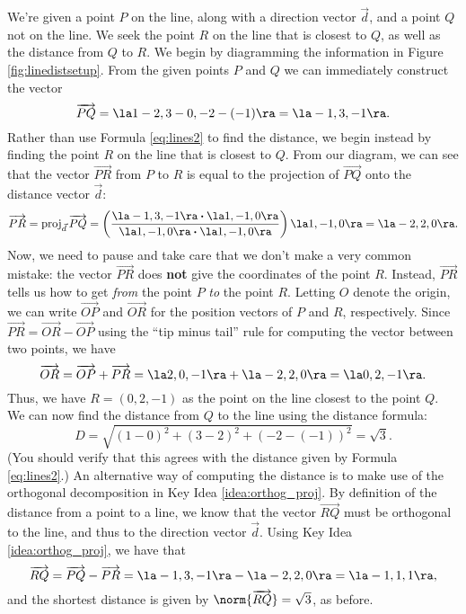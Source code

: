 {We're given a point $P$ on the line, along with a direction vector $\vec d$, and a point $Q$ not on the line. We seek the point $R$ on the line that is closest to $Q$, as well as the distance from $Q$ to $R$. We begin by diagramming the information in Figure \ref{fig:linedistsetup}. From the given points $P$ and $Q$ we can immediately construct the vector
\[
\overrightarrow{PQ}=\la 1-2, 3-0, -2-(-1)\ra = \la -1, 3, -1\ra.
\]
Rather than use Formula \eqref{eq:lines2} to find the distance, we begin instead by finding the point $R$ on the line that is closest to $Q$. From our diagram, we can see that the vector $\overrightarrow{PR}$ from $P$ to $R$ is equal to the projection of $\overrightarrow{PQ}$ onto the distance vector $\vec{d}$:
\[
\overrightarrow{PR}=\operatorname{proj}_{\vec{d}}\overrightarrow{PQ}= \left(\frac{\la -1,3,-1\ra\boldsymbol{\cdot}\la 1,-1,0\ra}{\la 1,-1,0\ra\boldsymbol{\cdot}\la 1,-1,0\ra}\right)\la 1,-1,0\ra = \la -2,2,0\ra.
\]
Now, we need to pause and take care that we don't make a very common mistake: the vector $\overrightarrow{PR}$ does \textbf{not} give the coordinates of the point $R$. Instead, $\overrightarrow{PR}$ tells us how to get \textit{from} the point $P$ \textit{to} the point $R$. Letting $O$ denote the origin, we can write $\overrightarrow{OP}$ and $\overrightarrow{OR}$ for the position vectors of $P$ and $R$, respectively. Since $\overrightarrow{PR} = \overrightarrow{OR}-\overrightarrow{OP}$ using the ``tip minus tail'' rule for computing the vector between two points, we have
\[
\overrightarrow{OR} = \overrightarrow{OP}+\overrightarrow{PR} = \la 2, 0, -1\ra + \la -2, 2, 0\ra = \la 0, 2, -1\ra.
\]
Thus, we have $R=(0,2,-1)$ as the point on the line closest to the point $Q$. We can now find the distance from $Q$ to the line using the distance formula:
\[
D= \sqrt{(1-0)^2+(3-2)^2+(-2-(-1))^2} = \sqrt{3}.
\]
(You should verify that this agrees with the distance given by Formula \eqref{eq:lines2}.)
An alternative way of computing the distance is to make use of the orthogonal decomposition in Key Idea \ref{idea:orthog_proj}. By definition of the distance from a point to a line, we know that the vector $\overrightarrow{RQ}$ must be orthogonal to the line, and thus to the direction vector $\vec{d}$. Using Key Idea \ref{idea:orthog_proj}, we have that
\[
\overrightarrow{RQ}= \overrightarrow{PQ}-\overrightarrow{PR} = \la -1, 3, -1\ra - \la -2, 2, 0\ra = \la -1, 1, 1\ra,
\]
and the shortest distance is given by $\norm{\overrightarrow{RQ}}=\sqrt{3}$, as before.
}\\


